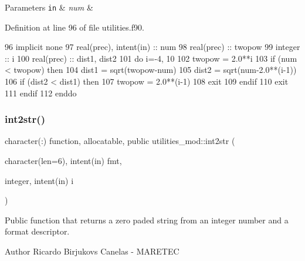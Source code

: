 \begin{DoxyParams}[1]{Parameters}
\mbox{\tt in}  & {\em num} & \\
\hline
\end{DoxyParams}


Definition at line 96 of file utilities.\+f90.


\begin{DoxyCode}
96     \textcolor{keywordtype}{implicit none}
97     \textcolor{keywordtype}{real(prec)}, \textcolor{keywordtype}{intent(in)} :: num
98     \textcolor{keywordtype}{real(prec)} :: twopow
99     \textcolor{keywordtype}{integer} :: i
100     \textcolor{keywordtype}{real(prec)} :: dist1, dist2    
101     \textcolor{keywordflow}{do} i=-4, 10
102         twopow = 2.0**i
103         \textcolor{keywordflow}{if} (num < twopow) \textcolor{keywordflow}{then}
104             dist1 = sqrt(twopow-num)
105             dist2 = sqrt(num-2.0**(i-1))
106             \textcolor{keywordflow}{if} (dist2 < dist1) \textcolor{keywordflow}{then}
107                 twopow = 2.0**(i-1)
108                 \textcolor{keywordflow}{exit}
109 \textcolor{keywordflow}{            endif}
110             \textcolor{keywordflow}{exit}
111 \textcolor{keywordflow}{        endif}
112 \textcolor{keywordflow}{    enddo}   
\end{DoxyCode}
\mbox{\label{namespaceutilities__mod_ab414aa8d1299fc8dfb5941113d050dd3}} 
\subsubsection{\texorpdfstring{int2str()}{int2str()}}
{\footnotesize\ttfamily character(\+:) function, allocatable, public utilities\+\_\+mod\+::int2str (\begin{DoxyParamCaption}\item[{character(len=6), intent(in)}]{fmt,  }\item[{integer, intent(in)}]{i }\end{DoxyParamCaption})}



Public function that returns a zero paded string from an integer number and a format descriptor. 

\begin{DoxyAuthor}{Author}
Ricardo Birjukovs Canelas -\/ M\+A\+R\+E\+T\+EC 
\end{DoxyAuthor}

